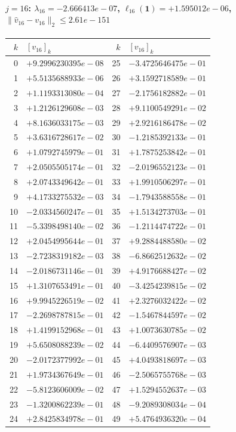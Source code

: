 \documentclass[11pt]{article}
\begin{document}
\paragraph{$j = 16$: $\lambda_{16} = -2.666413e-07$, \quad $\ell_{16}(\mathbf{1}) = +1.595012e-06$, \quad $\|\hat{v}_{16} - v_{16}\|_2 \leq 2.61e-151$}
\begin{center}
{\footnotesize
\begin{tabular}{r@{\;\;}l@{\quad}r@{\;\;}l}
\toprule
$k$ & $[v_{16}]_k$ & $k$ & $[v_{16}]_k$ \\
\midrule
0 & $+9.2996230395e-08$ & 25 & $-3.4725646475e-01$ \\
1 & $+5.5135688933e-06$ & 26 & $+3.1592718589e-01$ \\
2 & $+1.1193313080e-04$ & 27 & $-2.1756182882e-01$ \\
3 & $+1.2126129608e-03$ & 28 & $+9.1100549291e-02$ \\
4 & $+8.1636033175e-03$ & 29 & $+2.9216186478e-02$ \\
5 & $+3.6316728617e-02$ & 30 & $-1.2185392133e-01$ \\
6 & $+1.0792745979e-01$ & 31 & $+1.7875253842e-01$ \\
7 & $+2.0505505174e-01$ & 32 & $-2.0196552123e-01$ \\
8 & $+2.0743349642e-01$ & 33 & $+1.9910506297e-01$ \\
9 & $+4.1733275532e-03$ & 34 & $-1.7943588558e-01$ \\
10 & $-2.0334560247e-01$ & 35 & $+1.5134273703e-01$ \\
11 & $-5.3398498140e-02$ & 36 & $-1.2114474722e-01$ \\
12 & $+2.0454995644e-01$ & 37 & $+9.2884488580e-02$ \\
13 & $-2.7238319182e-03$ & 38 & $-6.8662512632e-02$ \\
14 & $-2.0186731146e-01$ & 39 & $+4.9176688427e-02$ \\
15 & $+1.3107653491e-01$ & 40 & $-3.4254239815e-02$ \\
16 & $+9.9945226519e-02$ & 41 & $+2.3276032422e-02$ \\
17 & $-2.2698787815e-01$ & 42 & $-1.5467844597e-02$ \\
18 & $+1.4199152968e-01$ & 43 & $+1.0073630785e-02$ \\
19 & $+5.6508088239e-02$ & 44 & $-6.4409576907e-03$ \\
20 & $-2.0172377992e-01$ & 45 & $+4.0493818697e-03$ \\
21 & $+1.9734367649e-01$ & 46 & $-2.5065755768e-03$ \\
22 & $-5.8123606009e-02$ & 47 & $+1.5294552637e-03$ \\
23 & $-1.3200862239e-01$ & 48 & $-9.2089308034e-04$ \\
24 & $+2.8425834978e-01$ & 49 & $+5.4764936320e-04$ \\
\bottomrule
\end{tabular}
}
\end{center}
\end{document}
